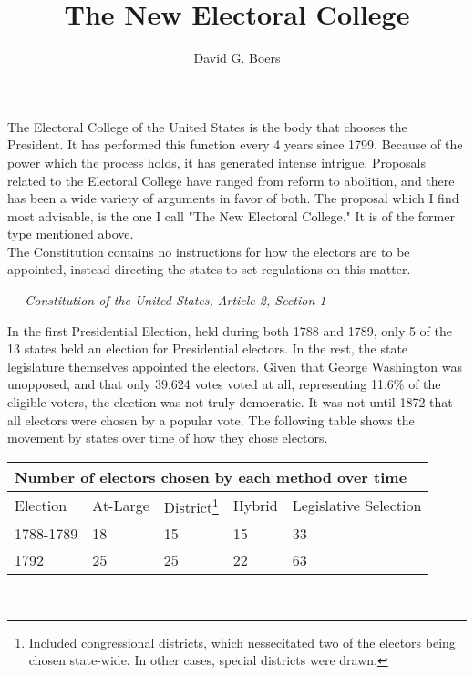 \documentclass{article}
\title{The New Electoral College}
\author{David G. Boers}
\begin{document}
    \maketitle
    The Electoral College of the United States is the body that chooses the President. It has performed this function every 4 years since 1799. Because of the power which the process holds, it has generated intense intrigue. Proposals related to the Electoral College have ranged from reform to abolition, and there has been a wide variety of arguments in favor of both. The proposal which I find most advisable, is the one I call "The New Electoral College." It is of the former type mentioned above.\\
    
    The Constitution contains no instructions for how the electors are to be appointed, instead directing the states to set regulations on this matter.\\

    \begin{flushright}\textit{--- Constitution of the United States, Article 2, Section 1}\end{flushright}%

    In the first Presidential Election, held during both 1788 and 1789, only 5 of the 13 states held an election for Presidential electors. In the rest, the state legislature themselves appointed the electors. Given that George Washington was unopposed, and that only 39,624 votes voted at all, representing 11.6\% of the eligible voters, the election was not truly democratic. It was not until 1872 that all electors were chosen by a popular vote. The following table shows the movement by states over time of how they chose electors.\\

    \begin{adjustbox}{center}
    \begin{tabular}{ |l|l|l|l|l| }
        \multicolumn{5}{|l|}{Number of electors chosen by each method over time} \\
        \hline
        Election & At-Large & District\footnote{Included congressional districts, which nessecitated two of the electors being chosen state-wide. In other cases, special districts were drawn.} & Hybrid & Legislative Selection \\
        \hline
        1788-1789 & 18 & 15 & 15 & 33 \\
        1792 & 25 & 25 & 22 & 63
    \end{tabular}
    \end{adjustbox} \\
\end{document}
